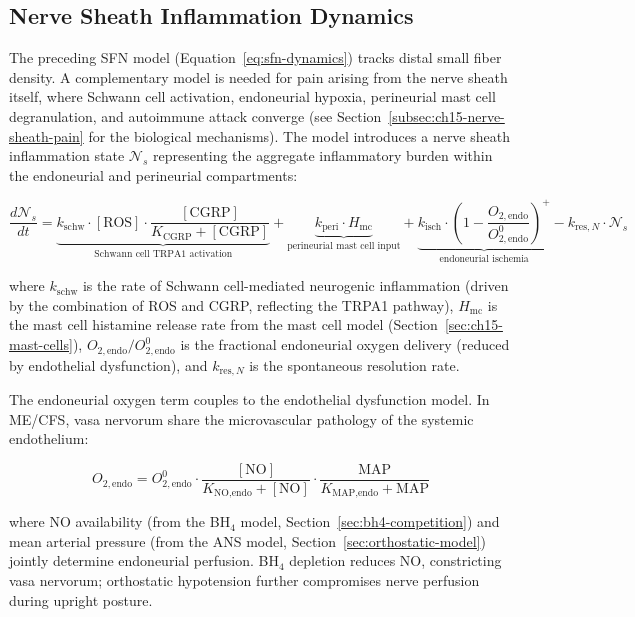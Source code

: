 \subsection{Nerve Sheath Inflammation Dynamics}
\label{subsec:nerve-sheath-model}

The preceding SFN model (Equation~\ref{eq:sfn-dynamics}) tracks distal small fiber density. A complementary model is needed for pain arising from the nerve sheath itself, where Schwann cell activation, endoneurial hypoxia, perineurial mast cell degranulation, and autoimmune attack converge (see Section~\ref{subsec:ch15-nerve-sheath-pain} for the biological mechanisms). The model introduces a nerve sheath inflammation state $\mathcal{N}_s$ representing the aggregate inflammatory burden within the endoneurial and perineurial compartments:

\begin{equation}
\label{eq:nerve-sheath-inflammation}
\frac{d\mathcal{N}_s}{dt} = \underbrace{k_{\text{schw}} \cdot [\text{ROS}] \cdot \frac{[\text{CGRP}]}{K_{\text{CGRP}} + [\text{CGRP}]}}_{\text{Schwann cell TRPA1 activation}} + \underbrace{k_{\text{peri}} \cdot H_{\text{mc}}}_{\text{perineurial mast cell input}} + \underbrace{k_{\text{isch}} \cdot \left(1 - \frac{O_{2,\text{endo}}}{O_{2,\text{endo}}^0}\right)^+}_{\text{endoneurial ischemia}} - k_{\text{res},N} \cdot \mathcal{N}_s
\end{equation}

where $k_{\text{schw}}$ is the rate of Schwann cell-mediated neurogenic inflammation (driven by the combination of ROS and CGRP, reflecting the TRPA1 pathway), $H_{\text{mc}}$ is the mast cell histamine release rate from the mast cell model (Section~\ref{sec:ch15-mast-cells}), $O_{2,\text{endo}}/O_{2,\text{endo}}^0$ is the fractional endoneurial oxygen delivery (reduced by endothelial dysfunction), and $k_{\text{res},N}$ is the spontaneous resolution rate.

The endoneurial oxygen term couples to the endothelial dysfunction model. In ME/CFS, vasa nervorum share the microvascular pathology of the systemic endothelium:

\begin{equation}
\label{eq:endoneurial-oxygen}
O_{2,\text{endo}} = O_{2,\text{endo}}^0 \cdot \frac{[\text{NO}]}{K_{\text{NO,endo}} + [\text{NO}]} \cdot \frac{\text{MAP}}{K_{\text{MAP,endo}} + \text{MAP}}
\end{equation}

where NO availability (from the BH$_4$ model, Section~\ref{sec:bh4-competition}) and mean arterial pressure (from the ANS model, Section~\ref{sec:orthostatic-model}) jointly determine endoneurial perfusion. BH$_4$ depletion reduces NO, constricting vasa nervorum; orthostatic hypotension further compromises nerve perfusion during upright posture.

